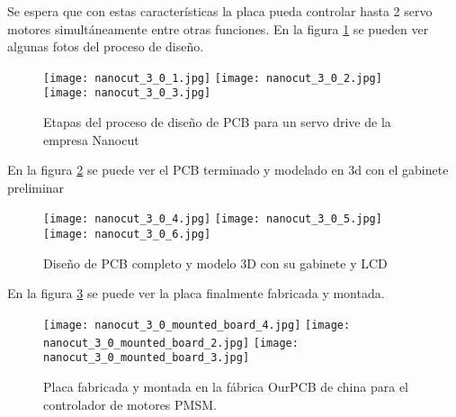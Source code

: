    Se espera que con estas características la placa pueda controlar hasta 2 servo motores simultáneamente entre otras funciones.
   En la figura \ref{fig:nanocut_3_0_1} se pueden ver algunas fotos del proceso de diseño.
  \begin{figure}
      \begin{center}
         \texttt{[image: nanocut\_3\_0\_1.jpg]}
         \texttt{[image: nanocut\_3\_0\_2.jpg]}
         \texttt{[image: nanocut\_3\_0\_3.jpg]}
      \end{center}
      \caption{Etapas del proceso de diseño de PCB para un servo drive de la empresa Nanocut}
      \label{fig:nanocut_3_0_1}
   \end{figure}

   En la figura \ref{fig:nanocut_3_0_2} se puede ver el PCB terminado y modelado en 3d con el gabinete preliminar
  \begin{figure}
      \begin{center}
         \texttt{[image: nanocut\_3\_0\_4.jpg]}
         \texttt{[image: nanocut\_3\_0\_5.jpg]}
         \texttt{[image: nanocut\_3\_0\_6.jpg]}
      \end{center}
      \caption{Diseño de PCB completo y modelo 3D con su gabinete y LCD}
      \label{fig:nanocut_3_0_2}
   \end{figure}

En la figura \ref{fig:nanocut_3_0_3} se puede ver la placa finalmente fabricada y montada.
  \begin{figure}
      \begin{center}
         \texttt{[image: nanocut\_3\_0\_mounted\_board\_4.jpg]}
         \texttt{[image: nanocut\_3\_0\_mounted\_board\_2.jpg]}
         \texttt{[image: nanocut\_3\_0\_mounted\_board\_3.jpg]}
      \end{center}
      \caption{Placa fabricada y montada en la fábrica OurPCB de china para el controlador de motores PMSM.}
      \label{fig:nanocut_3_0_3}
   \end{figure}
